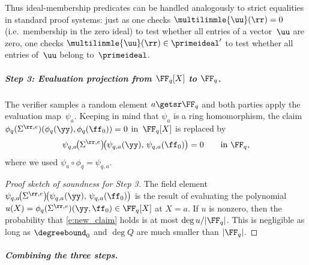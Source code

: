 Thus ideal-membership predicates can be handled analogously to strict equalities in standard proof systems: just as one checks $\multilinmle{\uu}(\rr)=0$ (i.e.\ membership in the zero ideal) to test whether all entries of a vector~$\uu$ are zero, one checks $\multilinmle{\uu}(\rr)\in\primeideal'$ to test whether all entries of~$\uu$ belong to~$\primeideal$.


\subparagraph{Step 3: Evaluation projection from $\FF_q[X]$ to $\FF_q$.}

The verifier samples a random element $a\getsr \FF_q$ and both parties apply the evaluation map~$\psi_a$. Keeping in mind that $\psi_a$ is a ring homomorphism, the claim $\phi_q(\Sigma^{\rr,e})(\phi_q(\yy), \phi_q(\ff_0))=0$ in~$\FF_q[X]$ is replaced by
\begin{equation}\label{e:new_claim}
\psi_{q,a}\!\bigl(\Sigma^{\rr,e}\bigr)\!\bigl(\psi_{q,a}(\yy),\, \psi_{q,a}(\ff_0)\bigr) = 0 \qquad \text{in } \FF_q,
\end{equation}
where we used $\psi_a \circ \phi_q = \psi_{q,a}$. 

\begin{proof}[Proof sketch of soundness for Step 3]  The field element $\psi_{q,a}\!\bigl(\Sigma^{\rr,e}\bigr)\!\bigl(\psi_{q,a}(\yy),\, \psi_{q,a}(\ff_0)\bigr)$ is the result of evaluating the polynomial $u(X)=\phi_q(\Sigma^{\rr,e})(\yy, \ff_0)\in \FF_q[X]$ at $X=a$. If $u$ is nonzero, then the probability that \eqref{e:new_claim} holds is at most $\deg u/|\FF_q|$. This is negligible as long as $\degreebound_0$ and $\deg Q$ are much smaller than $|\FF_q|$.
\end{proof}



\subparagraph{Combining the three steps.}

